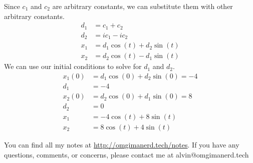 \documentclass{math}
\begin{document}
Since \( c_1 \) and \( c_2 \) are arbitrary constants, we can substitute them
with other arbitrary constants.
\begin{align*}
  d_1 &= c_1+c_2 \\
  d_2 &= ic_1-ic_2 \\
  x_1 &= d_1\cos(t)+d_2\sin(t) \\
  x_2 &= d_2\cos(t)-d_1\sin(t)
\end{align*}
We can use our initial conditions to solve for \( d_1 \) and \( d_2 \).
\begin{align*}
  x_1(0) &= d_1\cos(0)+d_2\sin(0) = -4 \\
  d_1 &= -4 \\
  x_2(0) &= d_2\cos(0)+d_1\sin(0) = 8 \\
  d_2 &= 0 \\
  x_1 &= -4\cos(t)+8\sin(t) \\
  x_2 &= 8\cos(t)+4\sin(t)
\end{align*}

\begin{center}
  You can find all my notes at \url{http://omgimanerd.tech/notes}. If you have
  any questions, comments, or concerns, please contact me at
  alvin@omgimanerd.tech
\end{center}
\end{document}
